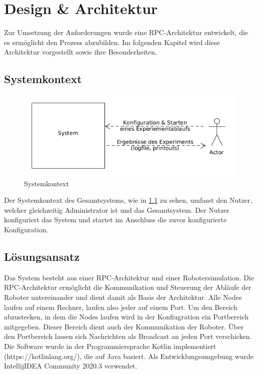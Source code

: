 %
\chapter{Design \& Architektur}

Zur Umsetzung der Anforderungen wurde eine RPC-Architektur entwickelt, die es ermöglicht den Prozess
abzubilden. Im folgenden Kapitel wird diese Architektur vorgestellt sowie ihre Besonderheiten.

\section{Systemkontext}

\begin{figure}[h]
 \includegraphics[width=\textwidth]{../diagrams/1_systemkontext.png}
 \caption{Systemkontext}
 \label{fig:systemkontext}
\end{figure}

Der Systemkontext des Gesamtsystems, wie in \ref{fig:systemkontext} zu sehen,
umfasst den Nutzer, welcher gleichzeitig Administrator ist und das Gesamtsystem.
Der Nutzer konfiguriert das System und startet im Anschluss die zuvor konfigurierte Konfiguration.
\clearpage

\section{Lösungsansatz}
\label{loesungsansatz}

Das System besteht aus einer RPC-Architektur und einer Robotersimulation. Die RPC-Architektur ermöglicht
die Kommunikation und Steuerung der Abläufe der Roboter untereinander und dient damit als Basis der
Architektur. Alle Nodes laufen auf einem Rechner, laufen also jeder auf einem Port.
Um den Bereich abzustecken, in dem die Nodes laufen wird in der Konfiugration ein Portbereich mitgegeben.
Dieser Bereich dient auch der Kommunikation der Roboter. Über den Portbereich lassen sich Nachrichten
als Broadcast an jeden Port verschicken.
Die Software wurde in der Programmiersprache \glqq Kotlin\grqq{} implementiert (https://kotlinlang.org/), die
auf Java basiert. Als Entwicklungsumgebung wurde IntellijIDEA Community 2020.3 verwendet.


